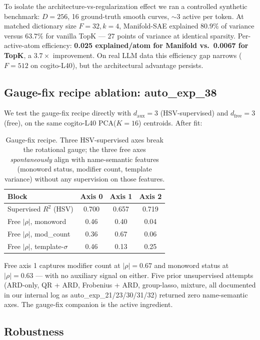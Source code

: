 \documentclass[10pt,twocolumn]{article}
\begin{document}
To isolate the architecture-vs-regularization effect we ran a controlled
synthetic benchmark: $D{=}256$, 16 ground-truth smooth curves, $\sim$3
active per token. At matched dictionary size $F{=}32, k{=}4$, Manifold-SAE
explained $80.9\%$ of variance versus $63.7\%$ for vanilla TopK --- $27$
points of variance at identical sparsity. Per-active-atom efficiency:
\textbf{0.025 explained/atom for Manifold vs.\ 0.0067 for TopK}, a
\textbf{$3.7\times$} improvement. On real LLM data this efficiency gap narrows
($F{=}512$ on cogito-L40), but the architectural advantage persists.

\subsection{Gauge-fix recipe ablation: auto\_exp\_38}

We test the gauge-fix recipe directly with $d_{\text{aux}}{=}3$ (HSV-supervised)
and $d_{\text{free}}{=}3$ (free), on the same cogito-L40 PCA($K{=}16$) centroids.
After fit:

\begin{table}[h]
\centering
\small
\begin{tabular}{lccc}
\toprule
Block & Axis 0 & Axis 1 & Axis 2 \\
\midrule
Supervised $R^2$ (HSV) & 0.700 & 0.657 & 0.719 \\
Free $|\rho|$, monoword & 0.46 & 0.40 & 0.04 \\
Free $|\rho|$, mod\_count & 0.36 & 0.67 & 0.06 \\
Free $|\rho|$, template-$\sigma$ & 0.46 & 0.13 & 0.25 \\
\bottomrule
\end{tabular}
\caption{Gauge-fix recipe. Three HSV-supervised axes break the rotational
gauge; the three free axes \emph{spontaneously} align with name-semantic
features (monoword status, modifier count, template variance) without any
supervision on those features.}
\label{tab:gauge}
\end{table}

Free axis 1 captures modifier count at $|\rho|{=}0.67$ and monoword status at
$|\rho|{=}0.63$ --- with no auxiliary signal on either. Five prior unsupervised
attempts (ARD-only, QR + ARD, Frobenius + ARD, group-lasso, mixture, all
documented in our internal log as auto\_exp\_21/23/30/31/32) returned zero
name-semantic axes. The gauge-fix companion is the active ingredient.

\subsection{Robustness}
\end{document}
